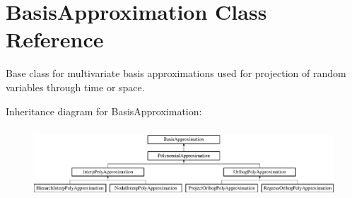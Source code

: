 \section{Basis\+Approximation Class Reference}
\label{classPecos_1_1BasisApproximation}


Base class for multivariate basis approximations used for projection of random variables through time or space.  


Inheritance diagram for Basis\+Approximation\+:\begin{figure}[H]
\begin{center}
\leavevmode
\includegraphics[height=2.666667cm]{classPecos_1_1BasisApproximation}
\end{center}
\end{figure}
